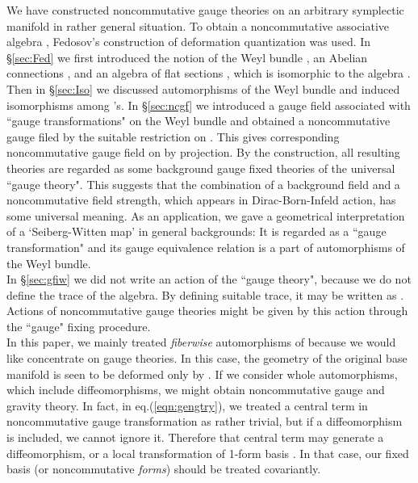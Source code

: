 \documentclass[10pt,a4paper]{article}
\def\h{\hbar}
\def\hA{{\hat A}}
\begin{document}
We have constructed noncommutative gauge theories on an arbitrary symplectic manifold \coordHE{} in rather general situation. To obtain a noncommutative associative algebra \myHighlight{$(C^\infty(M)[[\h]]\otimes {\cal A},*)$}\coordHE{}, Fedosov's construction \cite{Fedbk} of deformation quantization was used. In \S\ref{sec:Fed} we first introduced the notion of the Weyl bundle \coordHE{}, an Abelian connections \coordHE{}, and an algebra of flat sections \coordHE{}, which is isomorphic to the algebra \myHighlight{$(C^\infty(M)[[\h]]\otimes {\cal A},*)$}\coordHE{}. Then in \S\ref{sec:Iso} we discussed automorphisms of the Weyl bundle and induced isomorphisms among \coordHE{}'s. In \S\ref{sec:ncgf} we introduced a gauge field \myHighlight{$\hA$}\coordHE{} associated with ``gauge transformations" on the Weyl bundle and obtained a noncommutative gauge filed \myHighlight{${\hA}_\gamma$}\coordHE{} by the suitable restriction on \coordHE{}. This gives corresponding noncommutative gauge field \myHighlight{$\hA_{\gamma0}$}\coordHE{} on \myHighlight{$(C^\infty(M)[[\h]]\otimes {\cal A},*)$}\coordHE{} by \myHighlight{$\sigma$}\coordHE{} projection. By the construction, all resulting theories are regarded as some background gauge fixed theories of the universal ``gauge theory". This suggests that the combination of a background field and a noncommutative field strength, which appears in Dirac-Born-Infeld action, has some universal meaning. 
As an application, we gave a geometrical interpretation of a `Seiberg-Witten map' in general backgrounds: It is regarded as a ``gauge transformation" and its gauge equivalence relation is a part of automorphisms of the Weyl bundle.\\

In \S\ref{sec:gfiw} we did not write an action of the ``gauge theory", because we do not define the trace of the algebra. By defining suitable trace, it may be written as \coordHE{}. Actions of noncommutative gauge theories might be given by this action through the ``gauge" fixing procedure. \\

In this paper, we mainly treated {\it fiberwise} automorphisms of \coordHE{} because we would like concentrate on gauge theories. In this case, the geometry of the original base manifold \coordHE{} is seen to be deformed only by \myHighlight{${\cal O}(\h)$}\coordHE{}. If we consider whole automorphisms, which include diffeomorphisms, we might obtain noncommutative gauge and gravity theory. In fact, in eq.(\ref{eqn:gengtry}), we treated a central term in noncommutative gauge transformation as rather trivial, but if a diffeomorphism is included, we cannot ignore it. Therefore that central term may generate a diffeomorphism, or a local transformation of 1-form basis \coordHE{}. In that case, our fixed basis \coordHE{} (or noncommutative {\it forms}) should be treated covariantly.\\
\end{document}
